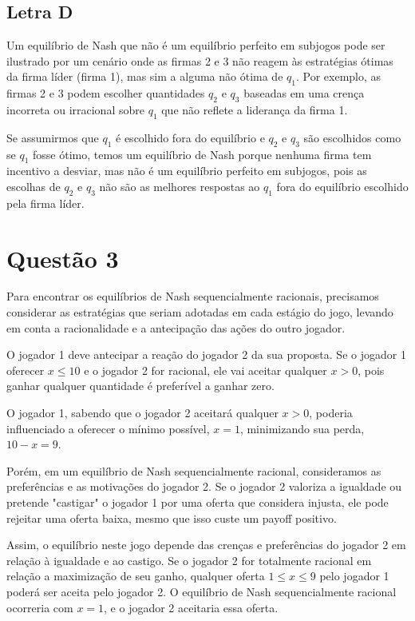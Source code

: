 \documentclass[a4paper,12pt]{article}[abntex2]
\begin{document}
\subsection{\textbf{Letra D}}
Um equilíbrio de Nash que não é um equilíbrio perfeito em subjogos pode ser ilustrado por um cenário onde as firmas 2 e 3 não reagem às estratégias ótimas da firma líder (firma 1), mas sim a alguma não ótima de \( q_1 \). Por exemplo, as firmas 2 e 3 podem escolher quantidades \( q_2 \) e \( q_3 \) baseadas em uma crença incorreta ou irracional sobre \( q_1 \) que não reflete a liderança da firma 1.

Se assumirmos que \( q_1 \) é escolhido fora do equilíbrio e \( q_2 \) e \( q_3 \) são escolhidos como se \( q_1 \) fosse ótimo, temos um equilíbrio de Nash porque nenhuma firma tem incentivo a desviar, mas não é um equilíbrio perfeito em subjogos, pois as escolhas de \( q_2 \) e \( q_3 \) não são as melhores respostas ao \( q_1 \) fora do equilíbrio escolhido pela firma líder.

\section{\textbf{Questão 3}}
Para encontrar os equilíbrios de Nash sequencialmente racionais, precisamos considerar as estratégias que seriam adotadas em cada estágio do jogo, levando em conta a racionalidade e a antecipação das ações do outro jogador.

O jogador 1 deve antecipar a reação do jogador 2 da sua proposta. Se o jogador 1 oferecer \( x \leq 10 \) e o jogador 2 for racional, ele vai aceitar qualquer \( x > 0 \), pois ganhar qualquer quantidade é preferível a ganhar zero.

O jogador 1, sabendo que o jogador 2 aceitará qualquer \( x > 0 \), poderia influenciado a oferecer o mínimo possível, \( x = 1 \), minimizando sua perda, \( 10 - x = 9 \).

Porém, em um equilíbrio de Nash sequencialmente racional,  consideramos as preferências e as motivações do jogador 2. Se o jogador 2 valoriza a igualdade ou pretende "castigar" o jogador 1 por uma oferta que considera injusta, ele pode rejeitar uma oferta baixa, mesmo que isso custe um payoff positivo.

Assim, o equilíbrio neste jogo depende das crenças e preferências do jogador 2 em relação à igualdade e ao castigo. Se o jogador 2 for totalmente racional em relação a maximização de seu ganho, qualquer oferta \( 1 \leq x \leq 9 \) pelo jogador 1 poderá ser aceita pelo jogador 2. O equilíbrio de Nash sequencialmente racional ocorreria com \( x = 1 \), e o jogador 2 aceitaria essa oferta.
\end{document}
